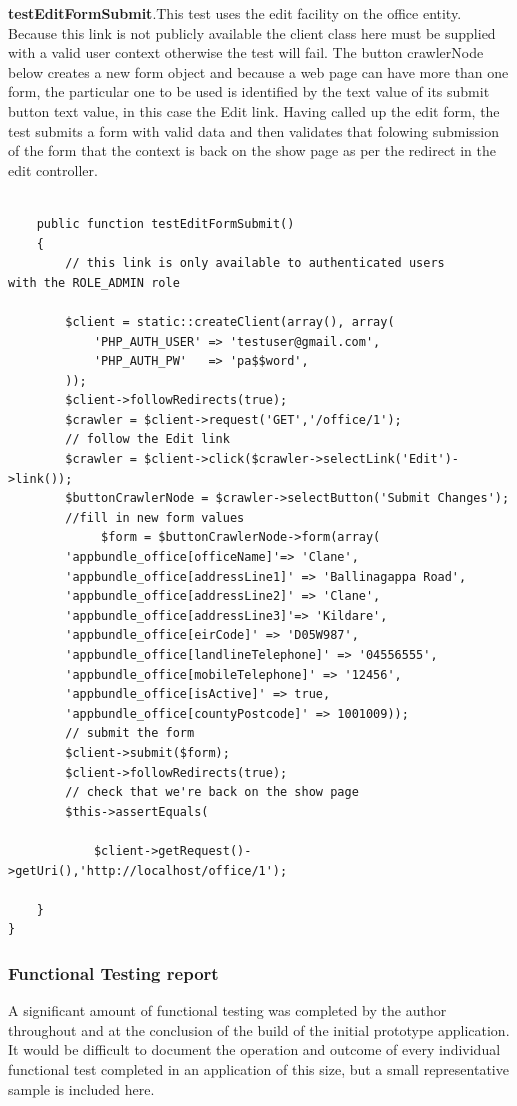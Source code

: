 \documentclass[a4paper,12pt]{article}
\begin{document}
\textbf{testEditFormSubmit}.This test uses the edit facility on the office entity. Because this link is not publicly available the client class here must be supplied with a valid user context otherwise the test will fail.
The button crawlerNode below creates a new form object and because a web page can have more than one form, the particular one to be used is identified by the text value of its submit button text value, in this case the Edit link.
Having called up the edit form, the test submits a form with valid data and then validates that folowing submission of the form that the context is back on the show page as per the redirect in the edit controller.
\begin{verbatim}

    public function testEditFormSubmit()
    {
        // this link is only available to authenticated users 
with the ROLE_ADMIN role

        $client = static::createClient(array(), array(
            'PHP_AUTH_USER' => 'testuser@gmail.com',
            'PHP_AUTH_PW'   => 'pa$$word',
        ));
        $client->followRedirects(true);
        $crawler = $client->request('GET','/office/1');
        // follow the Edit link
        $crawler = $client->click($crawler->selectLink('Edit')->link());
        $buttonCrawlerNode = $crawler->selectButton('Submit Changes');
        //fill in new form values
             $form = $buttonCrawlerNode->form(array(
        'appbundle_office[officeName]'=> 'Clane',
        'appbundle_office[addressLine1]' => 'Ballinagappa Road',
        'appbundle_office[addressLine2]' => 'Clane',
        'appbundle_office[addressLine3]'=> 'Kildare',
        'appbundle_office[eirCode]' => 'D05W987',
        'appbundle_office[landlineTelephone]' => '04556555',
        'appbundle_office[mobileTelephone]' => '12456',
        'appbundle_office[isActive]' => true,
        'appbundle_office[countyPostcode]' => 1001009));
        // submit the form
        $client->submit($form);
        $client->followRedirects(true);
        // check that we're back on the show page
        $this->assertEquals(

            $client->getRequest()->getUri(),'http://localhost/office/1');

    }
}
\end{verbatim}
\subsubsection{Functional Testing report}
A  significant amount of functional testing was completed by the author throughout and at the conclusion of the build of the initial prototype application. It would be difficult to document the operation and outcome of every individual functional test completed in an application of this size, but a small representative sample is included here.
\end{document}
